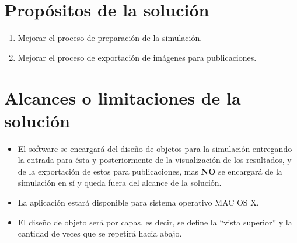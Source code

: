 


\section{Propósitos de la solución}
\begin{enumerate}
  \item Mejorar el proceso de preparación de la simulación.
  \item Mejorar el proceso de exportación de imágenes para publicaciones.
\end{enumerate}


\section{Alcances o limitaciones de la solución}
\begin{itemize}
	\item El software se encargará del diseño de objetos para la simulación entregando la entrada para ésta y posteriormente de la visualización de los resultados, y de la exportación de estos para publicaciones, mas \textbf{NO} se encargará de la simulación en sí y queda fuera del alcance de la solución.
	\item La aplicación estará disponible para sistema operativo MAC OS X.
	\item El diseño de objeto será por capas, es decir, se define la ``vista superior'' y la cantidad de veces que se repetirá hacia abajo.
\end{itemize}

